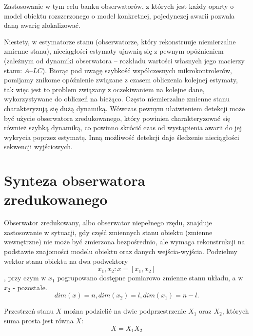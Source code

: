 \documentclass{article}
\begin{document}
		Zastosowanie w tym celu banku obserwatorów, z których jest każdy oparty o model
		obiektu rozszerzonego o model konkretnej, pojedynczej awarii pozwala daną awarię
		zlokalizować.

		Niestety, w estymatorze stanu (obserwatorze, który rekonstruuje niemierzalne zmienne
		stanu), nieciągłości estymaty ujawnią się z pewnym opóźnieniem (zależnym od dynamiki
		obserwatora – rozkładu wartości własnych jego macierzy stanu: $A – LC$). Biorąc pod
		uwagę szybkość współczesnych mikrokontrolerów, pomijamy znikome opóźnienie
		związane z czasem obliczenia kolejnej estymaty, tak więc jest to problem związany z
		oczekiwaniem na kolejne dane, wykorzystywane do obliczeń na bieżąco.
		Często niemierzalne zmienne stanu charakteryzują się dużą dynamiką. Wówczas
		pewnym ułatwieniem detekcji może być użycie obserwatora zredukowanego, który
		powinien charakteryzować się również szybką dynamiką, co powinno skrócić czas od
		wystąpienia awarii do jej wykrycia poprzez estymatę. Inną możliwość detekcji daje
		śledzenie nieciągłości sekwencji wyjściowych.
	\section{Synteza obserwatora zredukowanego}
		Obserwator zredukowany, albo obserwator niepełnego rzędu, znajduje zastosowanie w
		sytuacji, gdy część zmiennych stanu obiektu (zmienne wewnętrzne) nie może być zmierzona
		bezpośrednio, ale wymaga rekonstrukcji na podstawie znajomości modelu obiektu oraz
		danych wejścia-wyjścia.
		Podzielmy wektor stanu obiektu na dwa podwektory
		\begin{equation}
			x_1, x_2: x = [ x_1, x_2] 
		\end{equation}
		, przy czym w $x_1$
		pogrupowano dostępne pomiarowo zmienne stanu układu, a w $x_2$ - pozostałe.
		\begin{equation}
			dim(x) = n, dim(x_2) = l, dim(x_1) = n-l.
		\end{equation}
		
		Przestrzeń stanu $X$ można podzielić na dwie podprzestrzenie $X_1$ oraz $X_2$, których suma
		prosta jest równa $X$:
		\begin{equation}
			X = X_1  X_2
		\end{equation}
\end{document}
